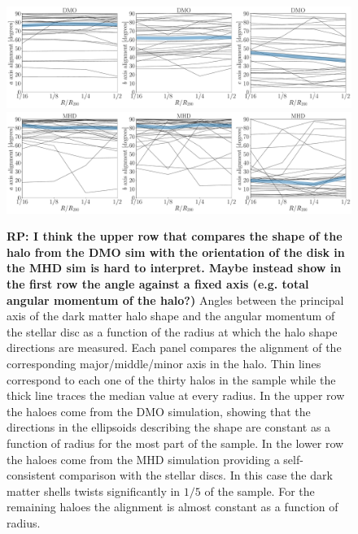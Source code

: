 \documentclass[usenatbib]{mnras}
\begin{document}
\begin{figure}
\begin{center}
\includegraphics[width=1.0\textwidth]{angles_alignment_DM.pdf}
\includegraphics[width=1.0\textwidth]{angles_alignment_MHD.pdf}
\end{center}
\caption{\textbf{RP: I think the upper row that compares the shape of the halo from the DMO sim with the orientation of the disk in the MHD sim is hard to interpret. Maybe instead show in the first row the angle against a fixed axis (e.g. total angular momentum of the halo?)} Angles between the principal axis of the dark matter halo
  shape and the angular momentum of the stellar disc 
  as a function of the radius at
  which the halo shape directions are measured.
  Each panel compares the alignment of the corresponding
  major/middle/minor axis in the halo.
  Thin lines correspond to each one of the thirty halos in the sample
  while the thick line traces the median value at every radius.
  In the upper row the haloes come from the DMO simulation, 
  showing that the directions in the ellipsoids describing the shape
  are constant as a function of radius for the most part of the sample.
  In the lower row the haloes come from the MHD simulation providing a 
  self-consistent comparison with the stellar discs. 
  In this case the dark matter shells twists significantly in $1/5$ of the sample. For the remaining haloes the alignment is almost constant as a function of radius.
}
\label{fig:cumulative_alignment}
\end{figure}
\end{document}
